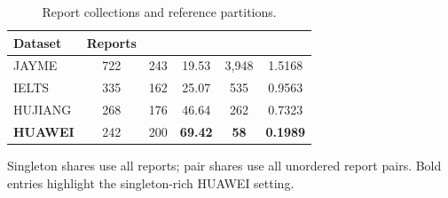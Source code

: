 \begin{table}[!htbp]
  \centering
  \caption{Report collections and reference partitions.}
  \label{tab:datasets}
  \begin{minipage}{0.90\linewidth}
  \centering
  \begingroup
  \fontsize{8.5}{9.6}\selectfont
  \setlength{\tabcolsep}{4pt}
  \renewcommand{\arraystretch}{1.0}
  \setlength{\heavyrulewidth}{0.7pt}
  \setlength{\lightrulewidth}{0.35pt}
  \setlength{\aboverulesep}{1.4pt}
  \setlength{\belowrulesep}{1.8pt}
  \begin{tabular*}{\linewidth}{@{\extracolsep{\fill}}lS[table-format=3]S[table-format=3]S[table-format=2.2]S[table-format=4]S[table-format=1.4]@{}}
    \toprule
    \textbf{Dataset} & {\textbf{Reports}}
      & {}
      & {}
      & {}
      & {} \\
    \midrule
    JAYME   & 722 & 243 & 19.53 & 3,948 & 1.5168 \\
    IELTS   & 335 & 162 & 25.07 &   535 & 0.9563 \\
    HUJIANG & 268 & 176 & 46.64 &   262 & 0.7323 \\
    \textbf{HUAWEI} & 242 & 200 & \bfseries 69.42 & \bfseries 58 & \bfseries 0.1989 \\
    \bottomrule
  \end{tabular*}
  \endgroup
  \par\vspace{2pt}
  {\fontsize{8}{9.2}\selectfont\raggedright Singleton shares use all reports; pair shares use all unordered report pairs. Bold entries highlight the singleton-rich HUAWEI setting.\par}
  \end{minipage}
\end{table}
